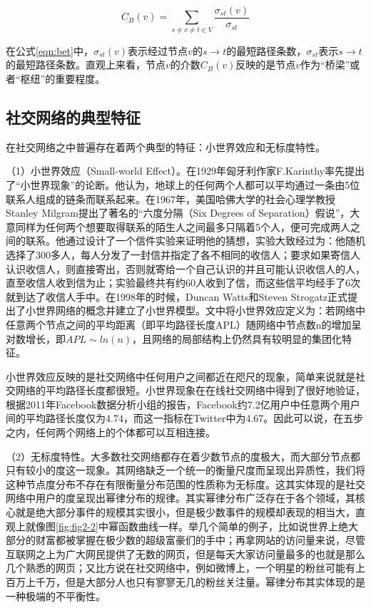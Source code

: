 \begin{equation}
  \label{eqn:bet}
  C_B(v)=\sum _{s\neq v\neq t \in V}\frac{\sigma_{st}(v)}{\sigma_{st}}
\end{equation}

在公式\ref{eqn:bet}中，$\sigma_{st}(v)$表示经过节点$v$的$s\rightarrow t$的最短路径条数，$\sigma_{st}$表示$s\rightarrow t$的最短路径条数。直观上来看，节点$v$的介数$C_B(v)$反映的是节点$v$作为“桥梁”或者“枢纽”的重要程度。

\subsection{社交网络的典型特征}

在社交网络之中普遍存在着两个典型的特征：小世界效应和无标度特性。

（1）小世界效应（Small-world Effect）。在1929年匈牙利作家F.Karinthy率先提出了“小世界现象”的论断。他认为，地球上的任何两个人都可以平均通过一条由5位联系人组成的链条而联系起来。在1967年，美国哈佛大学的社会心理学教授Stanley Milgram提出了著名的“六度分隔（Six Degrees of Separation）假说”，大意同样为任何两个想要取得联系的陌生人之间最多只隔着5个人，便可完成两人之间的联系。他通过设计了一个信件实验来证明他的猜想，实验大致经过为：他随机选择了300多人，每人分发了一封信并指定了各不相同的收信人；要求如果寄信人认识收信人，则直接寄出，否则就寄给一个自己认识的并且可能认识收信人的人，直至收信人收到信为止；实验最终共有约60人收到了信，而这些信平均经手了6次就到达了收信人手中。在1998年的时候，Duncan Watts和Steven Strogatz正式提出了小世界网络的概念并建立了小世界模型\cite{Watts1998Collectivedynamics}。文中将小世界效应定义为：若网络中任意两个节点之间的平均距离（即平均路径长度APL）随网络中节点数n的增加呈对数增长，即$APL\sim ln(n)$，且网络的局部结构上仍然具有较明显的集团化特征。

小世界效应反映的是社交网络中任何用户之间都近在咫尺的现象，简单来说就是社交网络的平均路径长度都很短。小世界现象在在线社交网络中得到了很好地验证，根据2011年Facebook数据分析小组的报告，Facebook约7.2亿用户中任意两个用户间的平均路径长度仅为4.74，而这一指标在Twitter中为4.67。因此可以说，在五步之内，任何两个网络上的个体都可以互相连接。

（2）无标度特性。大多数社交网络都存在着少数节点的度极大，而大部分节点都只有较小的度这一现象。其网络缺乏一个统一的衡量尺度而呈现出异质性，我们将这种节点度分布不存在有限衡量分布范围的性质称为无标度。这其实体现的是社交网络中用户的度呈现出幂律分布的规律。其实幂律分布广泛存在于各个领域，其核心就是绝大部分事件的规模其实很小，但是极少数事件的规模却表现的相当大，直观上就像图\ref{fig:fig2-2}中幂函数曲线一样。举几个简单的例子，比如说世界上绝大部分的财富都被掌握在极少数的超级富豪们的手中；再拿网站的访问量来说，尽管互联网之上为广大网民提供了无数的网页，但是每天大家访问量最多的也就是那么几个熟悉的网页；又比方说在社交网络中，例如微博上，一个明星的粉丝可能有上百万上千万，但是大部分人也只有寥寥无几的粉丝关注量。幂律分布其实体现的是一种极端的不平衡性。

